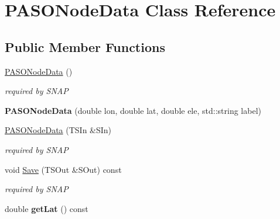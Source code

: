 \hypertarget{class_p_a_s_o_node_data}{}\section{P\+A\+S\+O\+Node\+Data Class Reference}
\label{class_p_a_s_o_node_data}
\subsection*{Public Member Functions}
\begin{DoxyCompactItemize}
\item 
\hypertarget{class_p_a_s_o_node_data_ac730fab5d4ca84bf27437c25a7887d50}{}\hyperlink{class_p_a_s_o_node_data_ac730fab5d4ca84bf27437c25a7887d50}{P\+A\+S\+O\+Node\+Data} ()\label{class_p_a_s_o_node_data_ac730fab5d4ca84bf27437c25a7887d50}

\begin{DoxyCompactList}\small\item\em required by S\+N\+A\+P \end{DoxyCompactList}\item 
\hypertarget{class_p_a_s_o_node_data_a9df687de334850940cbf17afbafc83d8}{}{\bfseries P\+A\+S\+O\+Node\+Data} (double lon, double lat, double ele, std\+::string label)\label{class_p_a_s_o_node_data_a9df687de334850940cbf17afbafc83d8}

\item 
\hypertarget{class_p_a_s_o_node_data_a857ac44c21cead55cbc027bd81b2709d}{}\hyperlink{class_p_a_s_o_node_data_a857ac44c21cead55cbc027bd81b2709d}{P\+A\+S\+O\+Node\+Data} (T\+S\+In \&S\+In)\label{class_p_a_s_o_node_data_a857ac44c21cead55cbc027bd81b2709d}

\begin{DoxyCompactList}\small\item\em required by S\+N\+A\+P \end{DoxyCompactList}\item 
\hypertarget{class_p_a_s_o_node_data_aea9fc19e2e81dc2eec71a3468b085d94}{}void \hyperlink{class_p_a_s_o_node_data_aea9fc19e2e81dc2eec71a3468b085d94}{Save} (T\+S\+Out \&S\+Out) const \label{class_p_a_s_o_node_data_aea9fc19e2e81dc2eec71a3468b085d94}

\begin{DoxyCompactList}\small\item\em required by S\+N\+A\+P \end{DoxyCompactList}\item 
\hypertarget{class_p_a_s_o_node_data_ac90b0b69a62abd77a1bcaf324f95d2ac}{}double {\bfseries get\+Lat} () const \label{class_p_a_s_o_node_data_ac90b0b69a62abd77a1bcaf324f95d2ac}


\end{DoxyCompactItemize}
